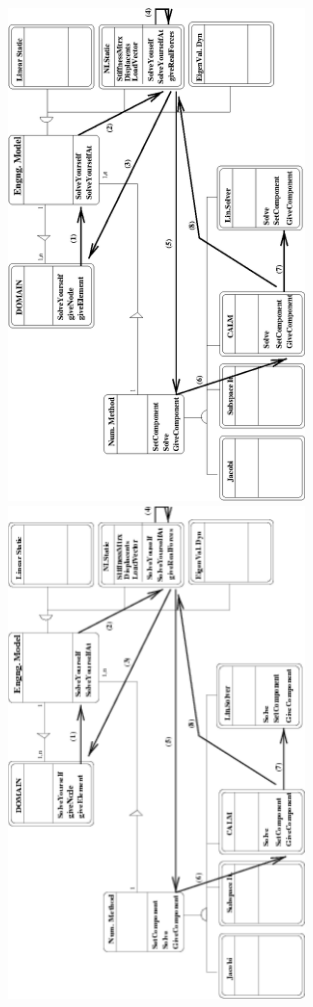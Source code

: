 \documentclass[a4paper]{article}
\begin{document}
\begin{figure}[tb]
\begin{htmlonly}
  \centerline{\includegraphics[width=0.7\textwidth]{struct2.eps}}
\end{htmlonly}
\ifpdf
\centerline{\includegraphics[width=0.7\textwidth]{struct2.pdf}}

\end{figure}
\end{document}
